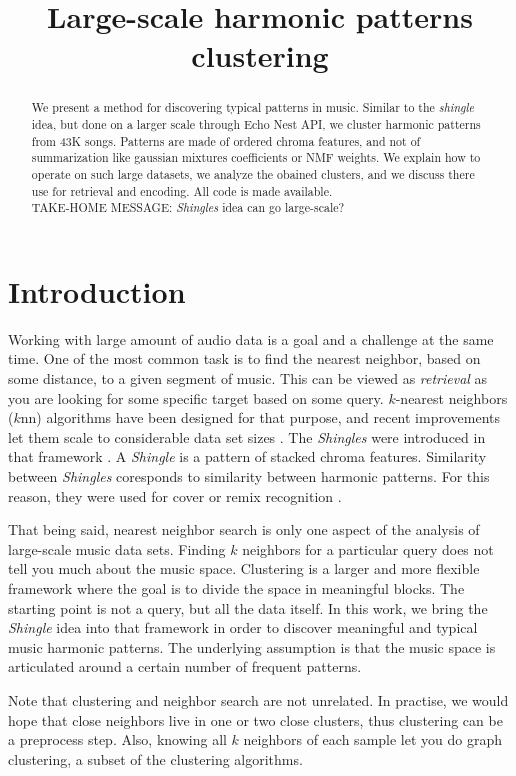 \documentclass{article}
\title{Large-scale harmonic patterns clustering}
\begin{document}
%
\maketitle
%
\begin{abstract}
We present a method for discovering typical patterns in music.
Similar to the \textit{shingle} idea, but done on a larger scale through
Echo Nest API, we cluster harmonic patterns from 43K songs. Patterns are
made of ordered chroma features, and not of summarization like gaussian
mixtures coefficients or NMF weights. We explain
how to operate on such large datasets, we analyze the obained clusters,
and we discuss there use for retrieval and encoding. All code is made
available.\\
TAKE-HOME MESSAGE: \textit{Shingles} idea can go large-scale?
\end{abstract}
%
\section{Introduction}\label{sec:introduction}

Working with large amount of audio data is a goal and a challenge at the
same time. One of the most common task is to find the nearest neighbor,
based on some distance, to a given segment of music. This can be viewed
as \textit{retrieval} as you are looking for some specific target
based on some query. $k$-nearest neighbors ($k$nn) algorithms have been
designed for that purpose, and recent improvements let them scale to
considerable data set sizes \cite{Datar2004}. The \textit{Shingles}
were introduced in that framework \cite{Casey2006}. A \textit{Shingle}
is a pattern of stacked chroma features. Similarity between
\textit{Shingles} coresponds to similarity between harmonic patterns. For this
reason, they were used for cover or remix recognition \cite{Casey2007}.

That being said, nearest neighbor search is only one aspect of the
analysis of large-scale music data sets. Finding $k$ neighbors for a
particular query does not tell you much about the music space.
Clustering is a larger and more flexible framework where the goal is
to divide the space in meaningful blocks. The starting point is not
a query, but all the data itself. In this work, we bring the
\textit{Shingle} idea into that framework in order to discover
meaningful and typical music harmonic patterns. The underlying assumption
is that the music space is articulated around a certain number of
frequent patterns.

Note that clustering and neighbor search are not unrelated.
In practise, we would hope that close neighbors live in one or two
close clusters, thus clustering can be a preprocess step. Also,
knowing all $k$ neighbors of each sample let you do graph clustering,
a subset of the clustering algorithms.
\end{document}

